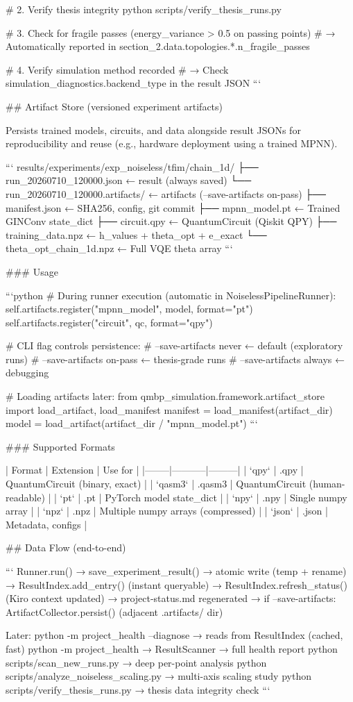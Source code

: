 # 2. Verify thesis integrity
python scripts/verify_thesis_runs.py

# 3. Check for fragile passes (energy_variance > 0.5 on passing points)
# → Automatically reported in section_2.data.topologies.*.n_fragile_passes

# 4. Verify simulation method recorded
# → Check simulation_diagnostics.backend_type in the result JSON
```

## Artifact Store (versioned experiment artifacts)

Persists trained models, circuits, and data alongside result JSONs for
reproducibility and reuse (e.g., hardware deployment using a trained MPNN).

```
results/experiments/exp_noiseless/tfim/chain_1d/
├── run_20260710_120000.json              ← result (always saved)
└── run_20260710_120000.artifacts/        ← artifacts (--save-artifacts on-pass)
    ├── manifest.json                     ← SHA256, config, git commit
    ├── mpnn_model.pt                     ← Trained GINConv state_dict
    ├── circuit.qpy                       ← QuantumCircuit (Qiskit QPY)
    ├── training_data.npz                 ← h_values + theta_opt + e_exact
    └── theta_opt_chain_1d.npz            ← Full VQE theta array
```

### Usage

```python
# During runner execution (automatic in NoiselessPipelineRunner):
self.artifacts.register("mpnn_model", model, format="pt")
self.artifacts.register("circuit", qc, format="qpy")

# CLI flag controls persistence:
#   --save-artifacts never    ← default (exploratory runs)
#   --save-artifacts on-pass  ← thesis-grade runs
#   --save-artifacts always   ← debugging

# Loading artifacts later:
from qmbp_simulation.framework.artifact_store import load_artifact, load_manifest
manifest = load_manifest(artifact_dir)
model = load_artifact(artifact_dir / "mpnn_model.pt")
```

### Supported Formats

| Format | Extension | Use for |
|--------|-----------|---------|
| `qpy` | .qpy | QuantumCircuit (binary, exact) |
| `qasm3` | .qasm3 | QuantumCircuit (human-readable) |
| `pt` | .pt | PyTorch model state_dict |
| `npy` | .npy | Single numpy array |
| `npz` | .npz | Multiple numpy arrays (compressed) |
| `json` | .json | Metadata, configs |

## Data Flow (end-to-end)

```
Runner.run() → save_experiment_result()
    → atomic write (temp + rename)
    → ResultIndex.add_entry() (instant queryable)
    → ResultIndex.refresh_status() (Kiro context updated)
    → project-status.md regenerated
    → if --save-artifacts: ArtifactCollector.persist() (adjacent .artifacts/ dir)

Later:
    python -m project_health --diagnose     → reads from ResultIndex (cached, fast)
    python -m project_health                → ResultScanner → full health report
    python scripts/scan_new_runs.py         → deep per-point analysis
    python scripts/analyze_noiseless_scaling.py → multi-axis scaling study
    python scripts/verify_thesis_runs.py    → thesis data integrity check
```
